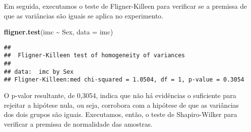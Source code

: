 \documentclass[
]{article}
\newenvironment{Shaded}{\begin{snugshade}}{\end{snugshade}}
\newcommand{\AttributeTok}[1]{\textcolor[rgb]{0.13,0.29,0.53}{#1}}
\newcommand{\CommentTok}[1]{\textcolor[rgb]{0.56,0.35,0.01}{\textit{#1}}}
\newcommand{\DecValTok}[1]{\textcolor[rgb]{0.00,0.00,0.81}{#1}}
\newcommand{\FunctionTok}[1]{\textcolor[rgb]{0.13,0.29,0.53}{\textbf{#1}}}
\newcommand{\NormalTok}[1]{#1}
\newcommand{\OtherTok}[1]{\textcolor[rgb]{0.56,0.35,0.01}{#1}}
\newcommand{\SpecialCharTok}[1]{\textcolor[rgb]{0.81,0.36,0.00}{\textbf{#1}}}
\newcommand{\StringTok}[1]{\textcolor[rgb]{0.31,0.60,0.02}{#1}}
\begin{document}
\begin{Shaded}
\end{Shaded}

Em seguida, executamos o teste de Fligner-Killeen para verificar se a
premissa de que as variâncias são iguais se aplica no experimento.

\begin{Shaded}
\begin{Highlighting}[]
\FunctionTok{fligner.test}\NormalTok{(imc }\SpecialCharTok{\textasciitilde{}}\NormalTok{ Sex, }\AttributeTok{data =}\NormalTok{ imc) }
\end{Highlighting}
\end{Shaded}

\begin{verbatim}
## 
##  Fligner-Killeen test of homogeneity of variances
## 
## data:  imc by Sex
## Fligner-Killeen:med chi-squared = 1.0504, df = 1, p-value = 0.3054
\end{verbatim}

O p-valor resultante, de 0,3054, indica que não há evidências o
suficiente para rejeitar a hipótese nula, ou seja, corrobora com a
hipótese de que as variâncias dos dois grupos são iguais. Executamos,
então, o teste de Shapiro-Wilker para verificar a premissa de
normalidade das amostras.

\begin{Shaded}
\end{Shaded}
\end{document}
